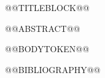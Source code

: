 \documentclass[11pt,a4paper]{@@DOCUMENTCLASSTOKEN@@}
\begin{document}
@@TITLEBLOCK@@

@@ABSTRACT@@

@@BODYTOKEN@@


@@BIBLIOGRAPHY@@
\end{document}
